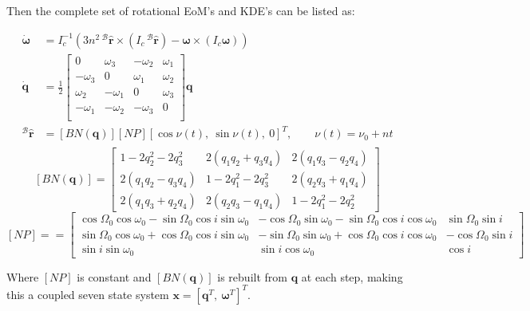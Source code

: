 \documentclass[titlepage]{article}
\begin{document}
Then the complete set of rotational EoM's and KDE's can be listed as:
\begin{mdframed}[linewidth=1pt, innertopmargin=10pt, innerbottommargin=10pt]
	\begin{equation}
		\begin{split}
			\dot{\boldsymbol{\omega}}&=I_c^{-1}\left(3n^2\,{}^{\mathcal{B}}\hat{\boldsymbol{r}}\times\left(I_c\,{}^{\mathcal{B}}\hat{\boldsymbol{r}}\right)-\boldsymbol{\omega}\times\left(I_c\boldsymbol{\omega}\right)\right) \\
			\dot{\boldsymbol{q}}&=\frac{1}{2}
			\begin{bmatrix}
				0 & \omega_3 & -\omega_2 & \omega_1 \\
				-\omega_3 & 0 & \omega_1 & \omega_2 \\
				\omega_2 & -\omega_1 & 0 & \omega_3 \\
				-\omega_1 & -\omega_2 & -\omega_3 & 0 \\
			\end{bmatrix}\boldsymbol{q} \\
			{}^{\mathcal{B}}\hat{\boldsymbol{r}}&=\left[BN(\boldsymbol{q})\right]\left[NP\right]\left[\cos\nu(t),\ \sin\nu(t),\ 0\right]^T,\qquad \nu(t)=\nu_0+nt \\
		\end{split}
	\end{equation}
	\footnotesize
	\begin{equation}
		\left[BN(\boldsymbol{q})\right]=
		\begin{bmatrix}
			1-2q_2^2-2q_3^2 & 2\left(q_1q_2+q_3q_4\right) & 2\left(q_1q_3-q_2q_4\right)\\
			2\left(q_1q_2-q_3q_4\right) & 1-2q_1^2-2q_3^2 & 2\left(q_2q_3+q_1q_4\right)\\
			2\left(q_1q_3+q_2q_4\right) & 2\left(q_2q_3-q_1q_4\right) & 1-2q_1^2-2q_2^2
		\end{bmatrix}
	\end{equation}
	\tiny
	\begin{equation}
		\left[NP\right]==
		\begin{bmatrix}
			\cos{\Omega_0}\cos{\omega_0}-\sin{\Omega_0}\cos{i}\sin{\omega_0} & -\cos{\Omega_0}\sin{\omega_0}-\sin{\Omega_0}\cos{i}\cos{\omega_0} & \sin{\Omega_0}\sin{i}\\
			\sin{\Omega_0}\cos{\omega_0}+\cos{\Omega_0}\cos{i}\sin{\omega_0} & -\sin{\Omega_0}\sin{\omega_0}+\cos{\Omega_0}\cos{i}\cos{\omega_0} & -\cos{\Omega_0}\sin{i}\\
			\sin{i}\sin{\omega_0} & \sin{i}\cos{\omega_0} & \cos{i}
		\end{bmatrix}
	\end{equation}
	\normalsize
	
	Where $\left[NP\right]$ is constant and $\left[BN(\boldsymbol{q})\right]$ is rebuilt from $\boldsymbol{q}$ at each step, making this a coupled seven state system $\boldsymbol{x}=[\boldsymbol{q}^T,\ \boldsymbol{\omega}^T]^T$.
\end{mdframed}
\end{document}
